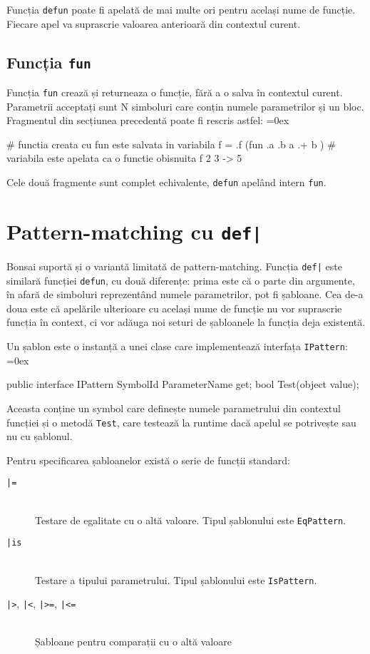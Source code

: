 \documentclass[12pt,a4paper]{memoir}
\renewcommand{\c}{\texttt}
\newenvironment{code}
{
\definecolor{shadecolor}{gray}{0.91}
\topsep=0ex
\relax
\shaded
\verbatim
}
{
\endverbatim
\endshaded
}
\begin{document}
Funcția \c{defun} poate fi apelată de mai multe ori pentru același nume de funcție. Fiecare apel va suprascrie valoarea anterioară din contextul curent.

\subsection{Funcția \c{fun}}

Funcția \c{fun} crează și returneaza o funcție, fără a o salva în contextul curent. Parametrii acceptați sunt N simboluri care conțin numele parametrilor și un bloc. Fragmentul din secțiunea precedentă poate fi rescris astfel:
\begin{code}
# functia creata cu fun este salvata in variabila f
= .f (fun .a .b { a .+ b })
# variabila este apelata ca o functie obisnuita
f 2 3
  -> 5
\end{code}

Cele două fragmente sunt complet echivalente, \c{defun} apelând intern \c{fun}.

\section{Pattern-matching cu \c{def|}}

Bonsai suportă și o variantă limitată de pattern-matching. Funcția \c{def|} este similară funcției \c{defun}, cu două diferențe:
prima este că o parte din argumente, în afară de simboluri reprezentând numele parametrilor, pot fi șabloane. Cea de-a doua este că apelările ulterioare cu același nume de funcție nu vor suprascrie funcția în context, ci vor adăuga noi seturi de șabloanele la funcția deja existentă.

Un șablon este o instanță a unei clase care implementează interfața \c{IPattern}:
\begin{code}
public interface IPattern {
  SymbolId ParameterName { get; }
  bool Test(object value);
}
\end{code}
Aceasta conține un symbol care definește numele parametrului din contextul funcției și o metodă \c{Test}, care testează la runtime dacă apelul se potrivește sau nu cu șablonul.

Pentru specificarea șabloanelor există o serie de funcții standard:
\begin{description}
\item[\c{|=}]\hfill\\ Testare de egalitate cu o altă valoare. Tipul șablonului este \c{EqPattern}.
\item[\c{|is}]\hfill\\ Testare a tipului parametrului. Tipul șablonului este \c{IsPattern}.
\item[\c{|>}, \c{|<}, \c{|>=}, \c{|<=}]\hfill\\ Șabloane pentru comparații cu o altă valoare
\end{description}
\end{document}
